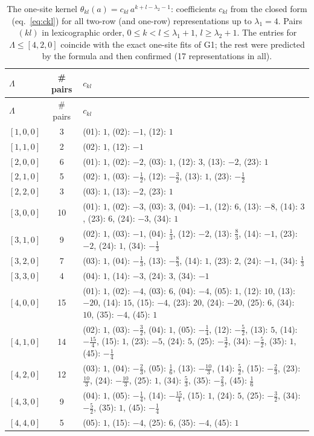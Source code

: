 \documentclass[11pt]{article}
\begin{document}
{\scriptsize
\begin{longtable}{lcp{11cm}}
\caption{The one-site kernel $\theta_{kl}(a)=c_{kl}\,a^{k+l-\lambda_2-1}$: coefficients $c_{kl}$ from the closed form (eq.~\ref{eq:ckl}) for all two-row (and one-row) representations up to $\lambda_1=4$. Pairs $(kl)$ in lexicographic order, $0\le k<l\le\lambda_1+1$, $l\ge\lambda_2+1$. The entries for $\Lambda\le[4,2,0]$ coincide with the exact one-site fits of G1; the rest were predicted by the formula and then confirmed (17 representations in all).}\label{tab:onesite}\\
\toprule
$\Lambda$ & \# pairs & $c_{kl}$ \\
\midrule
\endfirsthead
\toprule
$\Lambda$ & \# pairs & $c_{kl}$ \\
\midrule
\endhead
\bottomrule
\endlastfoot
$[1,0,0]$ & 3 & (01): $1$, (02): $-1$, (12): $1$ \\
$[1,1,0]$ & 2 & (02): $1$, (12): $-1$ \\
$[2,0,0]$ & 6 & (01): $1$, (02): $-2$, (03): $1$, (12): $3$, (13): $-2$, (23): $1$ \\
$[2,1,0]$ & 5 & (02): $1$, (03): $-\frac{1}{2}$, (12): $-\frac{3}{2}$, (13): $1$, (23): $-\frac{1}{2}$ \\
$[2,2,0]$ & 3 & (03): $1$, (13): $-2$, (23): $1$ \\
$[3,0,0]$ & 10 & (01): $1$, (02): $-3$, (03): $3$, (04): $-1$, (12): $6$, (13): $-8$, (14): $3$, (23): $6$, (24): $-3$, (34): $1$ \\
$[3,1,0]$ & 9 & (02): $1$, (03): $-1$, (04): $\frac{1}{3}$, (12): $-2$, (13): $\frac{8}{3}$, (14): $-1$, (23): $-2$, (24): $1$, (34): $-\frac{1}{3}$ \\
$[3,2,0]$ & 7 & (03): $1$, (04): $-\frac{1}{3}$, (13): $-\frac{8}{3}$, (14): $1$, (23): $2$, (24): $-1$, (34): $\frac{1}{3}$ \\
$[3,3,0]$ & 4 & (04): $1$, (14): $-3$, (24): $3$, (34): $-1$ \\
$[4,0,0]$ & 15 & (01): $1$, (02): $-4$, (03): $6$, (04): $-4$, (05): $1$, (12): $10$, (13): $-20$, (14): $15$, (15): $-4$, (23): $20$, (24): $-20$, (25): $6$, (34): $10$, (35): $-4$, (45): $1$ \\
$[4,1,0]$ & 14 & (02): $1$, (03): $-\frac{3}{2}$, (04): $1$, (05): $-\frac{1}{4}$, (12): $-\frac{5}{2}$, (13): $5$, (14): $-\frac{15}{4}$, (15): $1$, (23): $-5$, (24): $5$, (25): $-\frac{3}{2}$, (34): $-\frac{5}{2}$, (35): $1$, (45): $-\frac{1}{4}$ \\
$[4,2,0]$ & 12 & (03): $1$, (04): $-\frac{2}{3}$, (05): $\frac{1}{6}$, (13): $-\frac{10}{3}$, (14): $\frac{5}{2}$, (15): $-\frac{2}{3}$, (23): $\frac{10}{3}$, (24): $-\frac{10}{3}$, (25): $1$, (34): $\frac{5}{3}$, (35): $-\frac{2}{3}$, (45): $\frac{1}{6}$ \\
$[4,3,0]$ & 9 & (04): $1$, (05): $-\frac{1}{4}$, (14): $-\frac{15}{4}$, (15): $1$, (24): $5$, (25): $-\frac{3}{2}$, (34): $-\frac{5}{2}$, (35): $1$, (45): $-\frac{1}{4}$ \\
$[4,4,0]$ & 5 & (05): $1$, (15): $-4$, (25): $6$, (35): $-4$, (45): $1$ \\
\end{longtable}}
\end{document}
